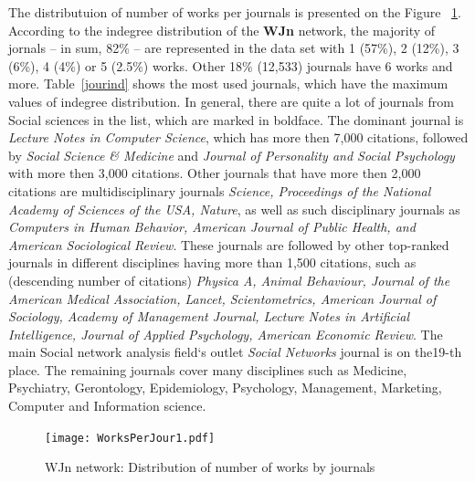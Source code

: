 \documentclass[11pt]{article} %
\begin{document}
The distributuion of number of works per journals is presented on the Figure ~\ref{worksjour}. According to the indegree distribution of the \textbf{WJn} network, the majority of jornals -- in sum, 82\% -- are represented  in the data set with 1 (57\%), 2 (12\%), 3 (6\%), 4 (4\%) or 5 (2.5\%) works. Other 18\% (12,533) journals have 6 works and more. Table~\ref{jourind} shows the most used journals, which have the maximum values of indegree distribution. In general, there are quite a lot of journals from Social sciences in the list, which are marked in boldface. The dominant journal is \textit{Lecture Notes in Computer Science}, which has more then 7,000 citations, followed by \textit{Social Science \& Medicine} and \textit{Journal of Personality and Social Psychology} with more then 3,000 citations. Other journals that have more then 2,000 citations are multidisciplinary journals \textit{Science, Proceedings of the National Academy of Sciences of the USA, Nature}, as well as  such disciplinary journals as \textit{Computers in Human Behavior, American Journal of Public Health, and American Sociological Review}. These journals are followed by other top-ranked journals in different disciplines having more than 1,500 citations, such as (descending number of citations) \textit{Physica A, Animal Behaviour, Journal of the American Medical Association, Lancet, Scientometrics, American Journal of Sociology, Academy of Management Journal, Lecture Notes in Artificial Intelligence, Journal of Applied Psychology, American Economic Review}. The main Social network analysis field`s outlet \textit{Social Networks} journal is on the19-th place. The remaining journals cover many disciplines such as  Medicine, Psychiatry, Gerontology, Epidemiology, Psychology, Management, Marketing, Computer and Information science. \medskip

\begin{figure}
\centerline{\texttt{[image: WorksPerJour1.pdf]}}
\caption{WJn network: Distribution of number of works by journals}\label{worksjour}
\end{figure}
\medskip   
\end{document}
